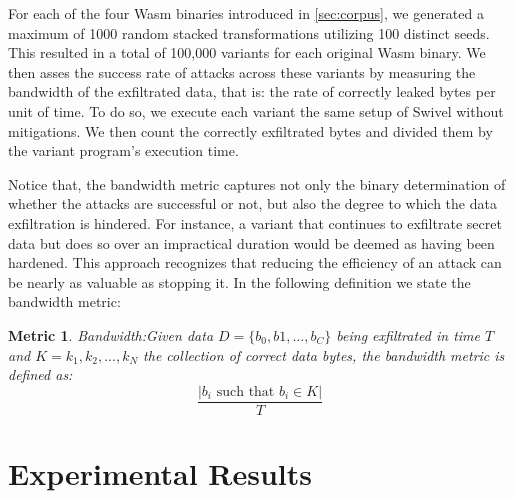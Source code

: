 \documentclass[sigplan,screen]{acmart}
\newcommand{\tool}{Wasm-mutate\xspace}
\newcommand{\wasm}{Wasm\xspace}
\newtheorem{metric}{Metric}
\begin{document}
For each of the four \wasm binaries introduced in \autoref{sec:corpus}, we generated a maximum of 1000 random stacked transformations utilizing 100 distinct seeds. 
This resulted in a total of 100,000 variants for each original \wasm binary.
We then asses the success rate of attacks across these variants by measuring the bandwidth of the exfiltrated data, that is: the rate of correctly leaked bytes per unit of time. 
To do so, we execute each variant the same setup of Swivel without mitigations.
We then count the correctly exfiltrated bytes and divided them by the variant program's execution time. 

Notice that, the bandwidth metric captures not only the binary determination of whether the attacks are successful or not, but also the degree to which the data exfiltration is hindered.
For instance, a variant that continues to exfiltrate secret data but does so over an impractical duration would be deemed as having been hardened. 
This approach recognizes that reducing the efficiency of an attack can be nearly as valuable as stopping it.
In the following definition we state the bandwidth metric:

\begin{metric}{Bandwidth:}\label{metric:ber}
Given data $D=\{b_0, b1, ..., b_C\}$ being exfiltrated in time $T$ and $K = {k_1, k_2, ..., k_N}$ the collection of correct data bytes, the bandwidth metric is defined as:
$$
    \frac{|b_i\text{ such that } b_i \in K|}{T}
$$
\end{metric}







 







\section{Experimental Results}
\label{results}
\end{document}
